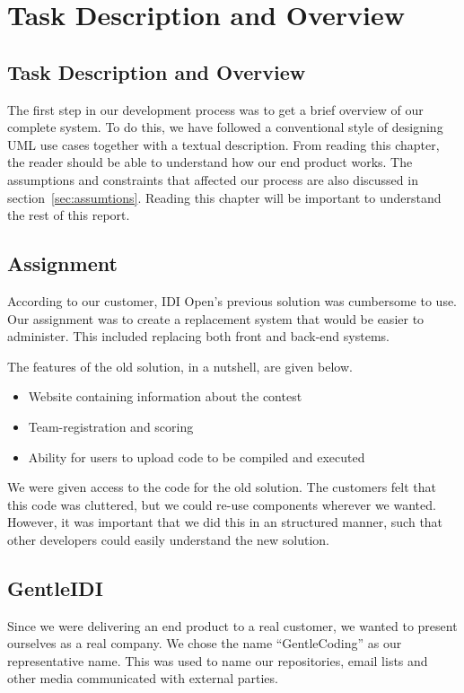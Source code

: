 \chapter{Task Description and Overview}

\section{Task Description and Overview}
\label{sec:taskdesc}

The first step in our development process was to get a brief overview of
our complete system. To do this, we have followed a conventional style
of designing UML use cases together with a textual description. From
reading this chapter, the reader should be able to understand how our
end product works. The assumptions and constraints that affected our 
process are also discussed in section~\ref{sec:assumtions}. 
Reading this chapter will be important to
understand the rest of this report.  

\section{Assignment}
According to our customer, IDI Open's previous solution was
cumbersome to use. Our assignment was to create a replacement system
that would be easier to administer.
This included replacing both front and back-end systems.

The features of the old solution, in a nutshell, are given below.
\begin{itemize}
\item Website containing information about the contest
\item Team-registration and scoring
\item Ability for users to upload code to be compiled and executed
\end{itemize}

We were given access to the code for the old solution. The customers
felt that this code was cluttered, but we could re-use components
wherever we wanted. However, it was important that we did this in an
structured manner, such that other developers could easily understand the
new solution.

\section{GentleIDI}

Since we were delivering an end product to a real customer, we wanted to
present ourselves as a real company. We chose the name
``GentleCoding'' as our
representative name. This was used to name our repositories, email
lists and other media communicated with external parties.

